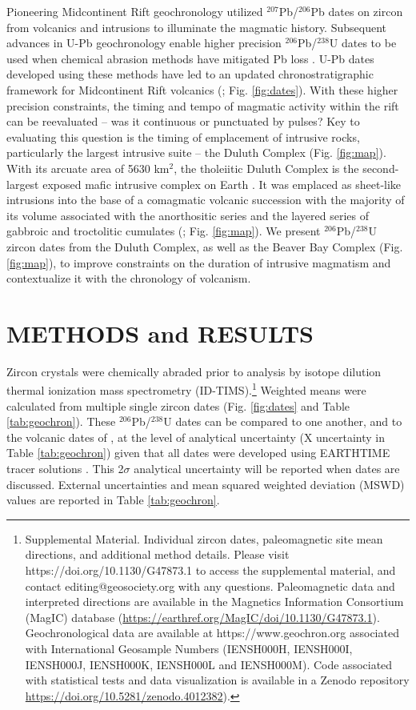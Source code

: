 \documentclass[11pt,letterpaper]{article}
\begin{document}
Pioneering Midcontinent Rift geochronology utilized $^{207}$Pb/$^{206}$Pb dates on zircon from volcanics \citep{Davis1997a} and intrusions \citep{Paces1993a} to illuminate the magmatic history. Subsequent advances in U-Pb geochronology enable higher precision $^{206}$Pb/$^{238}$U dates to be used when chemical abrasion methods have mitigated Pb loss \citep{Mattinson2005a}.  U-Pb dates developed using these methods have led to an updated chronostratigraphic framework for Midcontinent Rift volcanics (\citealp{Swanson-Hysell2019a}; Fig. \ref{fig:dates}). With these higher precision constraints, the timing and tempo of magmatic activity within the rift can be reevaluated -- was it continuous or punctuated by pulses? Key to evaluating this question is the timing of emplacement of intrusive rocks, particularly the largest intrusive suite -- the Duluth Complex (Fig. \ref{fig:map}). With its arcuate area of 5630 km$^2$, the tholeiitic Duluth Complex is the second-largest exposed mafic intrusive complex on Earth \citep{Miller2002c}. It was emplaced as sheet-like intrusions into the base of a comagmatic volcanic succession with the majority of its volume associated with the anorthositic series and the layered series of gabbroic and troctolitic cumulates (\citealp{Miller2002c}; Fig. \ref{fig:map}). We present $^{206}$Pb/$^{238}$U zircon dates from the Duluth Complex, as well as the Beaver Bay Complex (Fig. \ref{fig:map}), to improve constraints on the duration of intrusive magmatism and contextualize it with the chronology of volcanism.

\section*{METHODS and RESULTS}

Zircon crystals were chemically abraded prior to analysis by isotope dilution thermal ionization mass spectrometry (ID-TIMS).\footnote{Supplemental Material. Individual zircon dates, paleomagnetic site mean directions, and additional method details. Please visit https://doi.org/10.1130/G47873.1 to access the supplemental material, and contact editing@geosociety.org with any questions. Paleomagnetic data and interpreted directions are available in the Magnetics Information Consortium (MagIC) database (\url{https://earthref.org/MagIC/doi/10.1130/G47873.1}). Geochronological data are available at https://www.geochron.org associated with International Geosample Numbers (IENSH000H, IENSH000I, IENSH000J, IENSH000K, IENSH000L and IENSH000M). Code associated with statistical tests and data visualization is available in a Zenodo repository \url{https://doi.org/10.5281/zenodo.4012382}).} Weighted means were calculated from multiple single zircon dates (Fig. \ref{fig:dates} and Table \ref{tab:geochron}). These $^{206}$Pb/$^{238}$U dates can be compared to one another, and to the volcanic dates of \cite{Swanson-Hysell2019a}, at the level of analytical uncertainty (X uncertainty in Table \ref{tab:geochron}) given that all dates were developed using EARTHTIME tracer solutions \citep{Condon2015a}. This 2$\sigma$ analytical uncertainty will be reported when dates are discussed. External uncertainties and mean squared weighted deviation (MSWD) values are reported in Table \ref{tab:geochron}.
\end{document}
